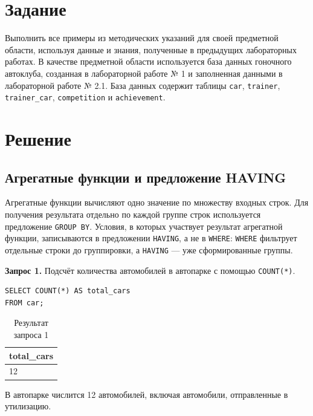 \documentclass[oneside,a4paper,14pt]{extarticle}
\begin{document}
\section{Задание}

Выполнить все примеры из методических указаний для своей предметной области, используя данные и знания, полученные в предыдущих лабораторных работах. В качестве предметной области используется база данных гоночного автоклуба, созданная в лабораторной работе № 1 и заполненная данными в лабораторной работе № 2.1. База данных содержит таблицы \texttt{car}, \texttt{trainer}, \texttt{trainer\_car}, \texttt{competition} и \texttt{achievement}.

\newpage
\section{Решение}

\subsection{Агрегатные функции и предложение HAVING}

Агрегатные функции вычисляют одно значение по множеству входных строк. Для получения результата отдельно по каждой группе строк используется предложение \texttt{GROUP BY}. Условия, в которых участвует результат агрегатной функции, записываются в предложении \texttt{HAVING}, а не в \texttt{WHERE}: \texttt{WHERE} фильтрует отдельные строки до группировки, а \texttt{HAVING} --- уже сформированные группы.

\textbf{Запрос 1.} Подсчёт количества автомобилей в автопарке с помощью \texttt{COUNT(*)}.

\begin{verbatim}
SELECT COUNT(*) AS total_cars
FROM car;
\end{verbatim}

\begin{table}[H]
\centering
\footnotesize

\caption{Результат запроса 1}\label{tab:agg1}
\begin{tabular}{|l|}
\hline
\textbf{total\_\allowbreak cars} \\ \hline
12 \\ \hline
\end{tabular}
\end{table}

В автопарке числится 12 автомобилей, включая автомобили, отправленные в утилизацию.
\end{document}
